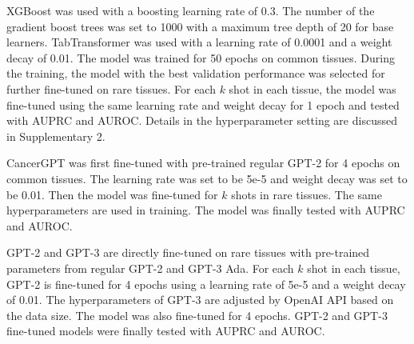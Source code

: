 XGBoost was used with a boosting learning rate of 0.3. The number of the gradient boost trees was set to 1000 with a maximum tree depth of 20 for base learners. TabTransformer was used with a learning rate of 0.0001 and a weight decay of 0.01. The model was trained for 50 epochs on common tissues. During the training, the model with the best validation performance was selected for further fine-tuned on rare tissues. For each $k$ shot in each tissue, the model was fine-tuned using the same learning rate and weight decay for 1 epoch and tested with AUPRC and AUROC. Details in the hyperparameter setting are discussed in Supplementary 2.

CancerGPT was first fine-tuned with pre-trained regular GPT-2 for 4 epochs on common tissues. The learning rate was set to be 5e-5 and weight decay was set to be 0.01. Then the model was fine-tuned for $k$ shots in rare tissues. The same hyperparameters are used in training. The model was finally tested with AUPRC and AUROC.

GPT-2 and GPT-3 are directly fine-tuned on rare tissues with pre-trained parameters from regular GPT-2 and GPT-3 Ada. For each $k$ shot in each tissue, GPT-2 is fine-tuned for 4 epochs using a learning rate of 5e-5 and a weight decay of 0.01. The hyperparameters of GPT-3 are adjusted by OpenAI API based on the data size. The model was also fine-tuned for 4 epochs. GPT-2 and GPT-3 fine-tuned models were finally tested with AUPRC and AUROC.


